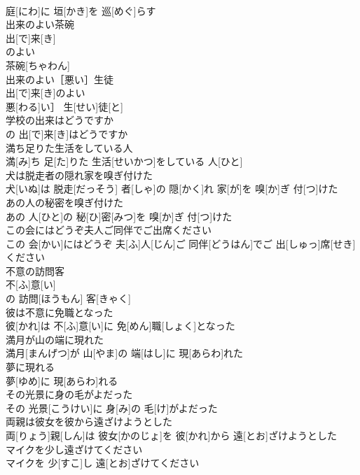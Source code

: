 \documentclass[8pt]{extreport}
\begin{document}
\begin{CJK}{UTF8}{min}
\\	庭[にわ]に 垣[かき]を 巡[めぐ]らす
\\	出来のよい茶碗	
\\	出[で]来[き]
\\	のよい 
\\	茶碗[ちゃわん] 
\\	出来のよい［悪い］生徒	
\\	出[で]来[き]のよい
\\	悪[わる]い］ 生[せい]徒[と]
\\	学校の出来はどうですか	
\\	[｟英国用法｠
\\	学校[がっこう]の 出[で]来[き]はどうですか
\\	満ち足りた生活をしている人	
\\	満[み]ち 足[た]りた 生活[せいかつ]をしている 人[ひと]
\\	犬は脱走者の隠れ家を嗅ぎ付けた	
\\	犬[いぬ]は 脱走[だっそう] 者[しゃ]の 隠[かく]れ 家[が]を 嗅[か]ぎ 付[つ]けた
\\	あの人の秘密を嗅ぎ付けた	
\\	あの 人[ひと]の 秘[ひ]密[みつ]を 嗅[か]ぎ 付[つ]けた
\\	この会にはどうぞ夫人ご同伴でご出席ください	
\\	この 会[かい]にはどうぞ 夫[ふ]人[じん]ご 同伴[どうはん]でご 出[しゅっ]席[せき]ください
\\	不意の訪問客	
\\	不[ふ]意[い]
\\	の 訪問[ほうもん] 客[きゃく]
\\	彼は不意に免職となった	
\\	彼[かれ]は 不[ふ]意[い]に 免[めん]職[しょく]となった
\\	満月が山の端に現れた	
\\	満月[まんげつ]が 山[やま]の 端[はし]に 現[あらわ]れた
\\	夢に現れる	
\\	夢[ゆめ]に 現[あらわ]れる
\\	その光景に身の毛がよだった	
\\	その 光景[こうけい]に 身[み]の 毛[け]がよだった
\\	両親は彼女を彼から遠ざけようとした	
\\	両[りょう]親[しん]は 彼女[かのじょ]を 彼[かれ]から 遠[とお]ざけようとした
\\	マイクを少し遠ざけてください	
\\	マイクを 少[すこ]し 遠[とお]ざけてください

\end{CJK}
\end{document}
